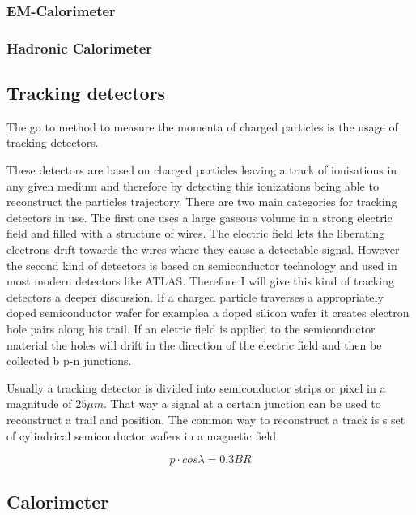 \subsubsection{EM-Calorimeter}

\subsubsection{Hadronic Calorimeter}




\subsection{Tracking detectors}

The go to method to measure the momenta of charged particles is the usage of tracking detectors.

These detectors are based on charged particles leaving a track of ionisations in any given medium and therefore by detecting this ionizations being able to reconstruct the particles trajectory.
There are two main categories for tracking detectors in use. The first one uses a large gaseous volume in a strong electric field and filled with a structure of wires. The electric field lets the liberating electrons drift towards the wires where they cause a detectable signal.
However the second kind of detectors is based on semiconductor technology and used in most modern detectors like ATLAS. Therefore I will give this kind of tracking detectors a deeper discussion.
If a charged particle traverses a appropriately doped semiconductor wafer for examplea a doped silicon wafer it creates electron hole pairs along his trail. If an eletric field is applied to the semiconductor material the holes will drift in the direction of the electric field and then be collected b p-n junctions.

Usually a tracking detector is divided into semiconductor strips or pixel in a magnitude of $25 \mu m$. That way a signal at a certain junction can be used to reconstruct a trail and position. The common way to reconstruct a track is s set of cylindrical semiconductor wafers in a magnetic field.


\begin{equation}
p \cdot cos \lambda = 0.3 BR
\end{equation}



\subsection{Calorimeter}

